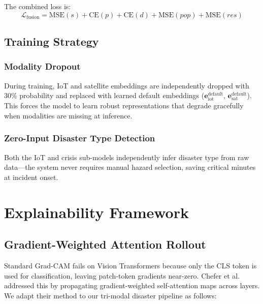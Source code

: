 \documentclass[journal]{IEEEtran}
\begin{document}
The combined loss is:
\begin{equation}
\mathcal{L}_\text{fusion} = \text{MSE}(s) + \text{CE}(p) + \text{CE}(d) + \text{MSE}(pop) + \text{MSE}(res)
\end{equation}

\subsection{Training Strategy}

\subsubsection{Modality Dropout}

During training, IoT and satellite embeddings are independently dropped with 30\% probability and replaced with learned default embeddings ($\mathbf{e}_\text{iot}^\text{default}$, $\mathbf{e}_\text{sat}^\text{default}$). This forces the model to learn robust representations that degrade gracefully when modalities are missing at inference.

\subsubsection{Zero-Input Disaster Type Detection}

Both the IoT and crisis sub-models independently infer disaster type from raw data---the system never requires manual hazard selection, saving critical minutes at incident onset.

\section{Explainability Framework}

\subsection{Gradient-Weighted Attention Rollout}

Standard Grad-CAM fails on Vision Transformers because only the CLS token is used for classification, leaving patch-token gradients near-zero. Chefer et al.~\cite{chefer2021transformer} addressed this by propagating gradient-weighted self-attention maps across layers. We adapt their method to our tri-modal disaster pipeline as follows:
\end{document}
